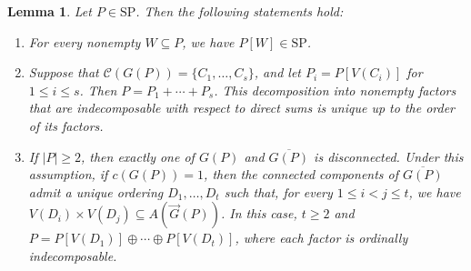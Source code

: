 \documentclass[11pt,a4paper]{article}
\newtheorem{lemma}[theorem]{Lemma}
\begin{document}
\begin{lemma}\label{lem:graph-decomposition}
Let $P\in\mathrm{SP}$. Then the following statements hold:
\begin{enumerate}
    \item[\textup{(i)}] For every nonempty $W\subseteq P$, we have $P[W]\in\mathrm{SP}$.
    \item[\textup{(ii)}] Suppose that $\mathcal C(G(P))=\{C_1,\ldots,C_s\}$,
    and let $P_i=P[V(C_i)]$ for $1\le i\le s$.
    Then $P=P_1+\cdots+P_s$.
    This decomposition into nonempty factors that are indecomposable
    with respect to direct sums is unique up to the order of its factors.
    \item[\textup{(iii)}]
    If $|P|\ge2$, then exactly one of $G(P)$ and $\overline{G(P)}$ is disconnected.
    Under this assumption, if $c(G(P))=1$, then the connected
    components of $\overline{G(P)}$ admit a unique ordering
    $D_1,\ldots,D_t$ such that, for every $1\le i<j\le t$,
    we have $V(D_i)\times V(D_j)\subseteq A(\vec G(P))$.
    In this case, $t\ge2$ and $P=P[V(D_1)]\oplus\cdots\oplus P[V(D_t)]$,
    where each factor is ordinally indecomposable.
\end{enumerate}
\end{lemma}
\end{document}
